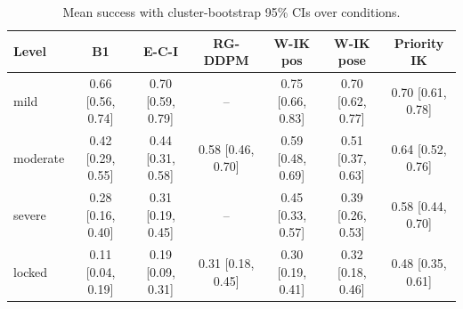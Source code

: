 \begin{table}[t]
\centering
\caption{Mean success with cluster-bootstrap 95\% CIs over conditions.}
\label{tab:main_ci}
\setlength{\tabcolsep}{3pt}
\begin{tabular}{lcccccc}
\toprule
Level & B1 & E-C-I & RG-DDPM & W-IK pos & W-IK pose & Priority IK \\
\midrule
mild & 0.66 [0.56, 0.74] & 0.70 [0.59, 0.79] & -- & 0.75 [0.66, 0.83] & 0.70 [0.62, 0.77] & 0.70 [0.61, 0.78] \\
moderate & 0.42 [0.29, 0.55] & 0.44 [0.31, 0.58] & 0.58 [0.46, 0.70] & 0.59 [0.48, 0.69] & 0.51 [0.37, 0.63] & 0.64 [0.52, 0.76] \\
severe & 0.28 [0.16, 0.40] & 0.31 [0.19, 0.45] & -- & 0.45 [0.33, 0.57] & 0.39 [0.26, 0.53] & 0.58 [0.44, 0.70] \\
locked & 0.11 [0.04, 0.19] & 0.19 [0.09, 0.31] & 0.31 [0.18, 0.45] & 0.30 [0.19, 0.41] & 0.32 [0.18, 0.46] & 0.48 [0.35, 0.61] \\
\bottomrule
\end{tabular}
\end{table}
